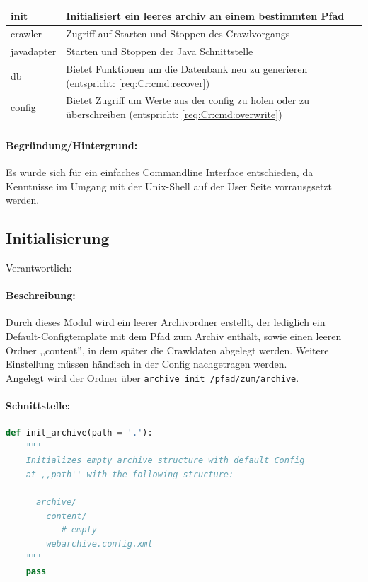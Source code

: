 \begin{table}[H]
\centering
\begin{tabular}{|l|l|}
    \hline
        init & Initialisiert ein leeres archiv an einem bestimmten Pfad \\
    \hline
        crawler & Zugriff auf Starten und Stoppen des Crawlvorgangs \\
    \hline
        javadapter & Starten und Stoppen der Java Schnittstelle \\
    \hline
    db & Bietet Funktionen um die Datenbank neu zu generieren
(entspricht: \ref{req:Cr:cmd:recover}) \\
    \hline
        config & Bietet Zugriff um Werte aus der config zu holen oder zu überschreiben
        (entspricht: \ref{req:Cr:cmd:overwrite}) \\
    \hline
\end{tabular}
\end{table}

\paragraph{Begründung/Hintergrund:}
\label{par:begr_ndung_}
Es wurde sich für ein einfaches Commandline Interface entschieden, da
Kenntnisse im Umgang mit der Unix-Shell auf der User Seite vorrausgsetzt
werden.


\subsection{Initialisierung} 
\label{sub:initialisierung}
Verantwortlich: \ciii

\paragraph{Beschreibung:}
\label{par:beschreibung}
Durch dieses Modul wird ein leerer Archivordner erstellt, der lediglich
ein Default-Configtemplate mit dem Pfad zum Archiv enthält, sowie einen leeren Ordner ,,content'',
in dem später die Crawldaten abgelegt werden.
Weitere Einstellung müssen händisch in der Config nachgetragen werden.
\\
Angelegt wird der Ordner über \texttt{archive init /pfad/zum/archive}.
\paragraph{Schnittstelle:}
\label{par:schnittstelle}
\hfill
\begin{lstlisting}[language=python]
def init_archive(path = '.'):
    """
    Initializes empty archive structure with default Config
    at ,,path'' with the following structure:

      archive/
        content/ 
           # empty
        webarchive.config.xml
    """
    pass
\end{lstlisting}

